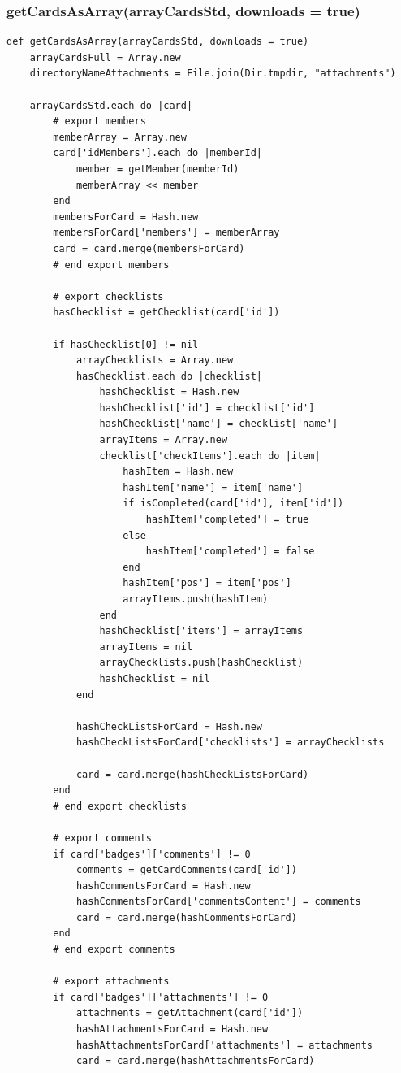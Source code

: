 \subsubsection{getCardsAsArray(arrayCardsStd, downloads = true)}
\begin{lstlisting}[aboveskip=1\baselineskip, caption= getCardsAsArray(), label=listing063]
def getCardsAsArray(arrayCardsStd, downloads = true)
	arrayCardsFull = Array.new
	directoryNameAttachments = File.join(Dir.tmpdir, "attachments")
	
	arrayCardsStd.each do |card|
		# export members
		memberArray = Array.new
		card['idMembers'].each do |memberId|
			member = getMember(memberId)
			memberArray << member			
		end
		membersForCard = Hash.new
		membersForCard['members'] = memberArray
		card = card.merge(membersForCard)
		# end export members		
		
		# export checklists
		hasChecklist = getChecklist(card['id']) 
		
		if hasChecklist[0] != nil
			arrayChecklists = Array.new
			hasChecklist.each do |checklist|  
				hashChecklist = Hash.new  
				hashChecklist['id'] = checklist['id']
				hashChecklist['name'] = checklist['name']
				arrayItems = Array.new
				checklist['checkItems'].each do |item|
					hashItem = Hash.new
					hashItem['name'] = item['name']
					if isCompleted(card['id'], item['id'])
						hashItem['completed'] = true
					else
						hashItem['completed'] = false
					end
					hashItem['pos'] = item['pos']
					arrayItems.push(hashItem)
				end
				hashChecklist['items'] = arrayItems
				arrayItems = nil
				arrayChecklists.push(hashChecklist)
				hashChecklist = nil
			end
			
			hashCheckListsForCard = Hash.new
			hashCheckListsForCard['checklists'] = arrayChecklists
			
			card = card.merge(hashCheckListsForCard)
		end
		# end export checklists
		
		# export comments
		if card['badges']['comments'] != 0
			comments = getCardComments(card['id'])
			hashCommentsForCard = Hash.new			
			hashCommentsForCard['commentsContent'] = comments			
			card = card.merge(hashCommentsForCard)
		end
		# end export comments
		
		# export attachments
		if card['badges']['attachments'] != 0
			attachments = getAttachment(card['id'])			
			hashAttachmentsForCard = Hash.new			
			hashAttachmentsForCard['attachments'] = attachments			
			card = card.merge(hashAttachmentsForCard)			
			

\end{lstlisting}
